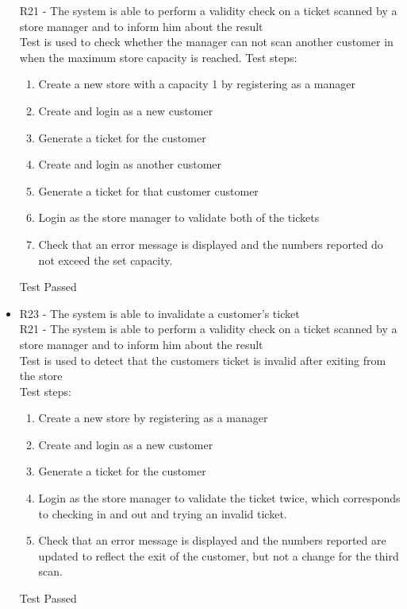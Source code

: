 \begin{itemize}
    R21 - The system is able to perform a validity check on a ticket scanned by a store manager and to inform him about the result \\
    Test is used to check whether the manager can not scan another customer in when the maximum store capacity is reached.
    Test steps: \\
    \begin{enumerate}
        \item Create a new store with a capacity 1 by registering as a manager
        \item Create and login as a new customer
        \item Generate a ticket for the customer
        \item Create and login as another customer
        \item Generate a ticket for that customer customer
        \item Login as the store manager to validate both of the tickets
        \item Check that an error message is displayed and the numbers reported do not exceed the set capacity.
    \end{enumerate}
    Test Passed\\
    \item R23 - The system is able to invalidate a customer's ticket \\
    R21 - The system is able to perform a validity check on a ticket scanned by a store manager and to inform him about the result \\
    Test is used to detect that the customers ticket is invalid after exiting from the store \\
    Test steps:
    \begin{enumerate}
        \item Create a new store by registering as a manager
        \item Create and login as a new customer
        \item Generate a ticket for the customer
        \item Login as the store manager to validate the ticket twice, which corresponds to checking in and out and trying an invalid ticket.
        \item Check that an error message is displayed and the numbers reported are updated to reflect the exit of the customer, but not a change for the third scan.
    \end{enumerate}
    Test Passed\\

\end{itemize}
